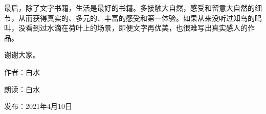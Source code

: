 最后，除了文字书籍，生活是最好的书籍。多接触大自然，感受和留意大自然的细节，从而获得真实的、多元的、丰富的感受和第一体验。如果从来没听过知鸟的鸣叫，没看到过水滴在荷叶上的场景，即便文字再优美，也很难写出真实感人的作品。



谢谢大家。

\vspace{10pt}

作者：白水

朗读：白水

发布：2021年4月10日

















                



\vspace{10pt}

\hline

